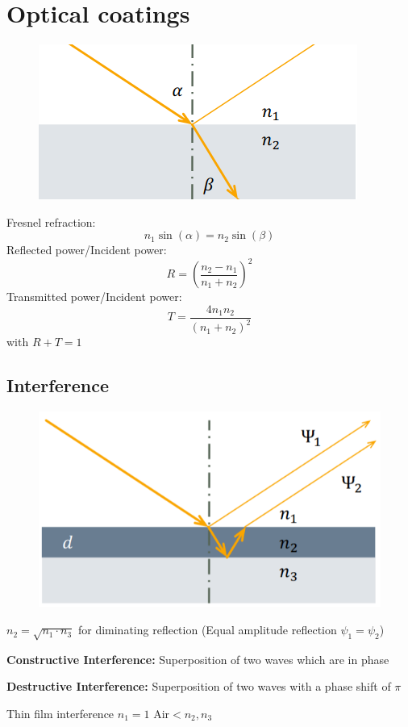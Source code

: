 \section{Optical coatings}
\begin{figure}[h]
    \centering
    \includegraphics[width=0.7\columnwidth]{images/fresnel.png}
    \label{fig:fresnel}
\end{figure}
Fresnel refraction:
\[
n_1 \sin(\alpha) = n_2 \sin(\beta)
\]
Reflected power/Incident power:
\[
R = \left(\frac{n_2-n_1}{n_1 + n_2}\right)^2
\]
Transmitted power/Incident power:
\[
T = \frac{4n_1n_2}{\left(n_1+n_2\right)^2}
\]
with \(R + T = 1\)

\subsection{Interference}
\begin{figure}[h]
    \centering
    \includegraphics[width=0.7\columnwidth]{images/ThimFilmInterference.png}
    \label{fig:fresnel}
\end{figure}
\(n_2 = \sqrt{n_1 \cdot n_3}\) for diminating reflection (Equal amplitude reflection \(\psi_1 = \psi_2\))

\textbf{Constructive Interference:} Superposition of two waves which are in phase

\textbf{Destructive Interference:} Superposition of two waves with a phase shift of \(\pi\)

Thin film interference \(n_1 = 1 \text{ Air} < n_2, n_3\)

